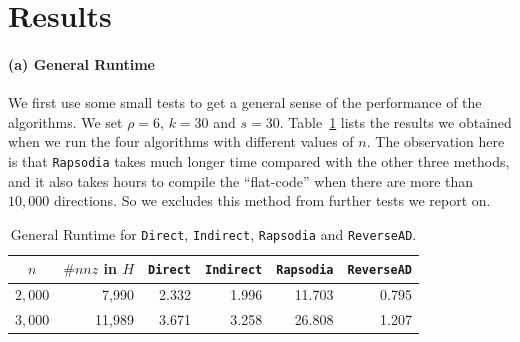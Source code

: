 \documentclass[11pt, a4paper, english]{article}
\begin{document}
\section*{Results}

\paragraph{(a) General Runtime} We first use some small tests to get a general sense of the performance of the algorithms. We set $\rho = 6$, $k = 30$ and $s = 30$. 
Table~\ref{tab:general} lists the results we obtained when
we run the four algorithms with different values of $n$.  The observation here is that
{\tt Rapsodia} takes much longer time compared with the other three methods, and it also takes hours to compile the ``flat-code'' when there are more than $10,000$ directions. 
So we excludes this method from further tests we report on.
\begin{table}[htbp]
\begin{center}
\begin{tabular}{ | c | r | r | r | r | r |}
\hline
$n$ & $\#nnz$ in $H$ & {\tt Direct} & {\tt Indirect} & {\tt Rapsodia} & {\tt ReverseAD} \\
\hline
$2,000$ & 7,990 & 2.332 & 1.996 & 11.703 & 0.795 \\
$3,000$ & 11,989 & 3.671 & 3.258 & 26.808 & 1.207\\
\hline 
\end{tabular}
\end{center}
\caption{General Runtime for {\tt Direct}, {\tt Indirect}, {\tt Rapsodia} and {\tt ReverseAD}.}
\label{tab:general}
\end{table}
\end{document}
